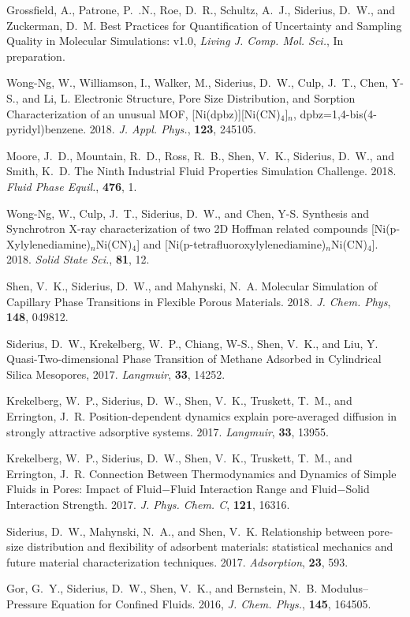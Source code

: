 Grossfield, A., Patrone, P.~.N., Roe, D.~R., Schultz, A.~J., Siderius, D.~W., and Zuckerman, D.~M. Best Practices for Quantification of Uncertainty and Sampling Quality in Molecular Simulations: v1.0, {\it Living J. Comp. Mol. Sci.}, In preparation.

Wong-Ng, W., Williamson, I., Walker, M., Siderius, D.~W., Culp, J.~T., Chen, Y-S., and Li, L. Electronic Structure, Pore Size Distribution, and Sorption Characterization of an unusual MOF, {[Ni(dpbz)][Ni(CN)$_4$]}$_n$, dpbz=1,4-bis(4-pyridyl)benzene. 2018. {\it J. Appl. Phys.}, {\bf 123}, 245105.

Moore, J.~D., Mountain, R.~D., Ross, R.~B., Shen, V.~K., Siderius, D.~W., and Smith, K.~D. The Ninth Industrial Fluid Properties Simulation Challenge. 2018. {\it Fluid Phase Equil.}, {\bf 476}, 1.

Wong-Ng, W., Culp, J.~T., Siderius, D.~W., and Chen, Y-S. Synthesis and Synchrotron X-ray characterization of two 2D Hoffman related compounds [Ni(p-Xylylenediamine)$_n$Ni(CN)$_4$] and [Ni(p-tetrafluoroxylylenediamine)$_n$Ni(CN)$_4$]. 2018. {\it Solid State Sci.}, {\bf 81}, 12.

Shen, V.~K., Siderius, D.~W., and Mahynski, N.~A. Molecular Simulation of Capillary Phase Transitions in Flexible Porous Materials. 2018. {\it J. Chem. Phys}, {\bf 148}, 049812.

Siderius, D.~W., Krekelberg, W.~P., Chiang, W-S., Shen, V.~K., and Liu, Y. Quasi-Two-dimensional Phase Transition of Methane Adsorbed in Cylindrical Silica Mesopores, 2017. {\it Langmuir}, {\bf 33}, 14252.

Krekelberg, W.~P., Siderius, D.~W., Shen, V.~K., Truskett, T.~M., and Errington, J.~R. Position-dependent dynamics explain pore-averaged diffusion in strongly attractive adsorptive systems. 2017. {\it Langmuir}, {\bf 33}, 13955.

Krekelberg, W.~P., Siderius, D.~W., Shen, V.~K., Truskett, T.~M., and Errington, J.~R. Connection Between Thermodynamics and Dynamics of Simple Fluids in Pores: Impact of Fluid−Fluid Interaction Range and Fluid−Solid Interaction Strength. 2017. {\it J. Phys. Chem. C}, {\bf 121}, 16316.

Siderius, D.~W., Mahynski, N.~A., and Shen, V.~K. Relationship between pore-size distribution and flexibility of adsorbent materials: statistical mechanics and future material characterization techniques. 2017. {\it Adsorption}, {\bf 23}, 593.

Gor, G.~Y., Siderius, D.~W., Shen, V.~K., and Bernstein, N.~B. Modulus--Pressure Equation for Confined Fluids. 2016, {\it J. Chem. Phys.}, {\bf 145}, 164505.

